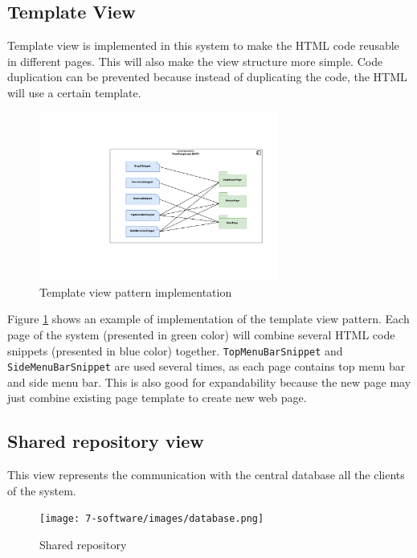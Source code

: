\clearpage
\subsection{Template View}
\label{sec:template-view}
Template view is implemented in this system to make the HTML code reusable in different pages. This will also make the view structure more simple. Code duplication can be prevented because instead of duplicating the code, the HTML will use a certain template.

\begin{figure}[H]
	\centering
	\includegraphics[width=0.7\textwidth]{7-software/images/template-view.pdf}
	\caption{Template view pattern implementation}
	\label{fig:template-view-architecture}
\end{figure}

Figure \ref{fig:template-view-architecture} shows an example of implementation of the template view pattern. Each page of the system (presented in green color) will combine several HTML code snippets (presented in blue color) together. \texttt{TopMenuBarSnippet} and \texttt{SideMenuBarSnippet} are used several times, as each page contains top menu bar and side menu bar. This is also good for expandability because the new page may just combine existing page template to create new web page.

\subsection{Shared repository view}
This view represents the communication with the central database all the clients of the system.
\begin{figure}[H]
	\centering
	\texttt{[image: 7-software/images/database.png]}
	\caption{Shared repository}
	\label{fig:mvc-architecture}
\end{figure}
